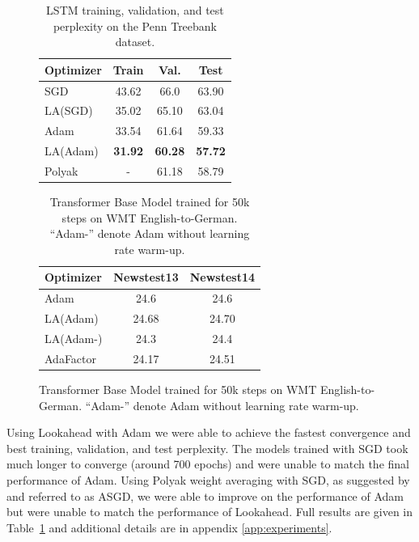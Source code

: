 \begin{figure}[t]
\begin{minipage}[t]{0.48 \linewidth}
\begin{table}[H]
\caption{LSTM training, validation, and test perplexity on the Penn Treebank dataset.}
\label{tab:lstm}
\vskip 0.1in
\begin{center}
\begin{small}
\begin{sc}
\begin{tabular}{l c c c }
\toprule
Optimizer & Train & Val. & Test  \\
\midrule
SGD & 43.62 & 66.0 & 63.90 \\
LA(SGD) & 35.02 & 65.10 & 63.04 \\ 
Adam & 33.54 & 61.64 & 59.33 \\
LA(Adam) & \textbf{31.92} & \textbf{60.28} & \textbf{57.72} \\
Polyak & - & 61.18 & 58.79 \\ 
\bottomrule
\end{tabular}
\end{sc}
\end{small}
\end{center}
\vskip -0.1in
\end{table}
\end{minipage}
\hfill
\begin{minipage}[t]{0.48 \linewidth}
\begin{table}[H]
\caption{Transformer Base Model trained for 50k steps on WMT English-to-German. ``Adam-'' denote Adam without learning rate warm-up.}
\label{tab:ntm}
\vskip 0.1in
\begin{center}
\begin{small}
\begin{sc}
\begin{tabular}{l c c }
\toprule
Optimizer & Newstest13 & Newstest14   \\
\midrule
Adam & 24.6 & 24.6 \\
LA(Adam) & 24.68 & 24.70 \\ 
LA(Adam-) & 24.3 & 24.4 \\
AdaFactor & 24.17 & 24.51 \\
\bottomrule
\end{tabular}
\end{sc}
\end{small}
\end{center}
\vskip -0.1in
\end{table}
\end{minipage}
\end{figure}

Using Lookahead with Adam we were able to achieve the fastest convergence and best training, validation, and test perplexity. The models trained with SGD took much longer to converge (around 700 epochs) and were unable to match the final performance of Adam. Using Polyak weight averaging \citep{polyak1992acceleration} with SGD, as suggested by \citet{merity2017regularizing} and referred to as ASGD, we were able to improve on the performance of Adam but were unable to match the performance of Lookahead.  Full results are given in Table~\ref{tab:lstm} and additional details are in appendix \ref{app:experiments}.
